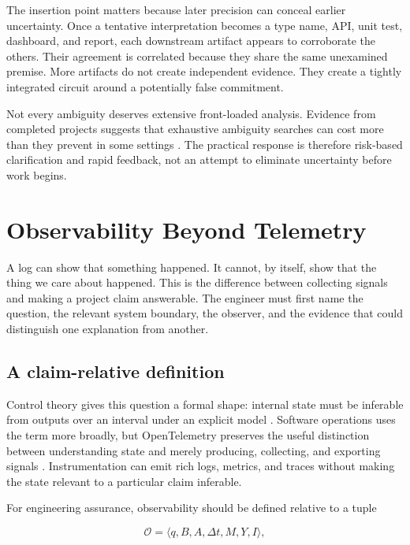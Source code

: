 \documentclass[10pt,a4paper]{article}
\begin{document}
The insertion point matters because later precision can conceal earlier uncertainty. Once a tentative interpretation becomes a type name, API, unit test, dashboard, and report, each downstream artifact appears to corroborate the others. Their agreement is correlated because they share the same unexamined premise. More artifacts do not create independent evidence. They create a tightly integrated circuit around a potentially false commitment.

Not every ambiguity deserves extensive front-loaded analysis. Evidence from completed projects suggests that exhaustive ambiguity searches can cost more than they prevent in some settings \cite{ribeiro2020}. The practical response is therefore risk-based clarification and rapid feedback, not an attempt to eliminate uncertainty before work begins.

\section{Observability Beyond Telemetry}

A log can show that something happened. It cannot, by itself, show that the thing we care about happened. This is the difference between collecting signals and making a project claim answerable. The engineer must first name the question, the relevant system boundary, the observer, and the evidence that could distinguish one explanation from another.

\subsection{A claim-relative definition}

Control theory gives this question a formal shape: internal state must be inferable from outputs over an interval under an explicit model \cite{kalman1960}. Software operations uses the term more broadly, but OpenTelemetry preserves the useful distinction between understanding state and merely producing, collecting, and exporting signals \cite{otel}. Instrumentation can emit rich logs, metrics, and traces without making the state relevant to a particular claim inferable.

For engineering assurance, observability should be defined relative to a tuple

\begin{equation}
\mathcal{O}=\langle q, B, A, \Delta t, M, Y, I \rangle,
\end{equation}
\end{document}

